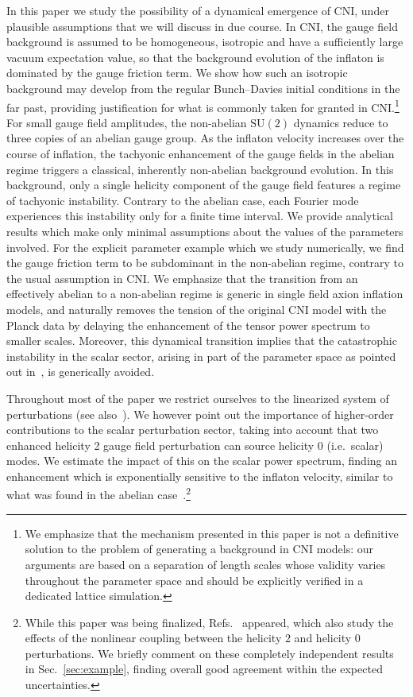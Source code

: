 In this paper we study the possibility of a dynamical emergence of CNI, under plausible assumptions that we will discuss in due course. In CNI, the gauge field background is assumed to be homogeneous, isotropic and have a sufficiently large vacuum expectation value, so that the background evolution of the inflaton is dominated by the gauge friction term.  We show how such an isotropic background may develop from the regular Bunch--Davies initial conditions in the far past, providing justification for what is commonly taken for granted in CNI.\footnote{We emphasize that the mechanism presented in this paper is not a definitive solution to the problem of generating a background in CNI models: our arguments are based on a separation of length scales whose validity varies throughout the parameter space and should be explicitly verified in a dedicated lattice simulation.} For small gauge field amplitudes, the non-abelian $\mathrm{SU}(2)$ dynamics reduce to three copies of an abelian gauge group. As the inflaton velocity increases over the course of inflation, the tachyonic enhancement of the gauge fields in the abelian regime triggers a classical, inherently non-abelian background evolution. In this background, only a single helicity component of the gauge field features a regime of tachyonic instability. Contrary to the abelian case, each Fourier mode experiences this instability only for a finite time interval. 
We provide analytical results which make only minimal assumptions about the values of the parameters involved.
For the explicit parameter example which we study numerically, we find the gauge friction term to be subdominant in the non-abelian regime, contrary to the usual assumption in CNI. We emphasize that the transition from an effectively abelian to a non-abelian regime is generic in single field axion inflation models, and naturally removes the tension of the original CNI model with the Planck data by delaying the enhancement of the tensor power spectrum to smaller scales. Moreover, this dynamical transition implies that the catastrophic instability in the scalar sector, arising in part of the parameter space as pointed out in~\cite{Dimastrogiovanni:2012ew}, is generically avoided.




Throughout most of the paper we restrict ourselves to the linearized system of perturbations (see also~\cite{Dimastrogiovanni:2012st,Dimastrogiovanni:2012ew,Adshead:2013qp,Adshead:2013nka}). We however point out the importance of higher-order contributions to the scalar perturbation sector, taking into account that two enhanced helicity 2 gauge field perturbation can source helicity 0 (i.e.\ scalar) modes. We estimate the impact of this on the scalar power spectrum, finding an enhancement which is exponentially sensitive to the inflaton velocity, similar to what was found in the abelian case~\cite{Linde:2012bt}.\footnote{While this paper was being finalized, Refs.~\cite{Dimastrogiovanni:2018xnn,Papageorgiou:2018rfx} appeared, which also study the effects of the nonlinear coupling between the helicity $2$ and helicity $0$ perturbations. We briefly comment on these completely independent results in Sec.~\ref{sec:example}, finding overall good agreement within the expected uncertainties.}


